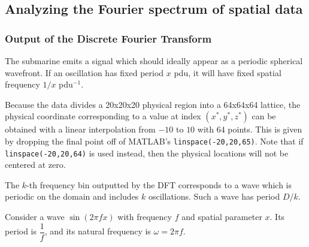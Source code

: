 \documentclass{article}
\begin{document}
\subsection{Analyzing the Fourier spectrum of spatial data}
\subsubsection{Output of the Discrete Fourier Transform}

%
The submarine emits a signal which should ideally appear as a periodic spherical wavefront. If an oscillation has fixed period $x$ pdu, it will have fixed spatial frequency $1/x$ pdu$^{-1}$.

Because the data divides a 20x20x20 physical region into a 64x64x64 lattice, the physical coordinate corresponding to a value at index $(x^*,y^*,z^*)$ can be obtained with a linear interpolation from $-10$ to $10$ with $64$ points. This is given by dropping the final point off of MATLAB's \texttt{linspace(-20,20,65)}. Note that if \texttt{linspace(-20,20,64)} is used instead, then the physical locations will not be centered at zero.

The $k$-th frequency bin outputted by the DFT corresponds to a wave which is periodic on the domain and includes $k$ oscillations. Such a wave has period $D/k$. 

Consider a wave $\sin(2\pi fx)$ with frequency $f$ and spatial parameter $x$. Its period is $\dfrac{1}{f}$, and its natural frequency is $\omega = 2\pi f$. 
\end{document}
